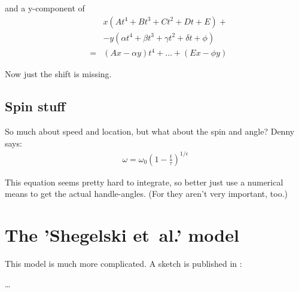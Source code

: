 and a y-component of
\begin{eqnarray}
&&  x ( At^4 + Bt^3 + Ct^2 + Dt + E ) + \nonumber \\
&& -y ( \alpha t^4 + \beta t^3 + \gamma t^2 + \delta t + \phi ) \\
&=& (Ax - \alpha y)t^4 + \ldots + (Ex - \phi y)
\end{eqnarray}

Now just the shift is missing.

\subsection{Spin stuff}

So much about speed and location, but what about the spin and angle?
Denny says:
\begin{eqnarray}
\omega = \omega_0 \left(1 - \frac{t}{\tau}\right)^{1/\epsilon}
\end{eqnarray}

This equation seems pretty hard to integrate, so better just use a numerical
means to get the actual handle-angles. (For they aren't very important, too.)

\clearpage
\section{The 'Shegelski et~al.' model}

This model is much more complicated. A sketch is published in
\cite{shegelski:96}:

\dots

